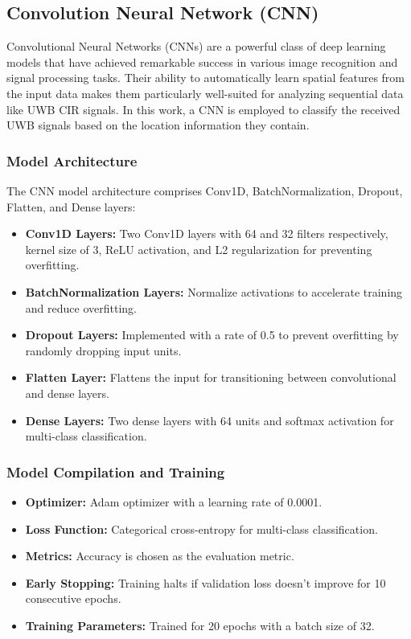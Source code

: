 \documentclass[
	article, %
	11pt, %
	draft, %
]{CSUniSchoolLabReport}
\begin{document}
\subsection{Convolution Neural Network (CNN)}\label{cnn}

Convolutional Neural Networks (CNNs) are a powerful class of deep learning models that have achieved remarkable success in various image recognition and signal processing tasks. Their ability to automatically learn spatial features from the input data makes them particularly well-suited for analyzing sequential data like UWB CIR signals. In this work, a CNN is employed to classify the received UWB signals based on the location information they contain.

\subsubsection{Model Architecture}

The CNN model architecture comprises Conv1D, BatchNormalization, Dropout, Flatten, and Dense layers:

\begin{itemize}
    \item \textbf{Conv1D Layers:} Two Conv1D layers with 64 and 32 filters respectively, kernel size of 3, ReLU activation, and L2 regularization for preventing overfitting.
    \item \textbf{BatchNormalization Layers:} Normalize activations to accelerate training and reduce overfitting.
    \item \textbf{Dropout Layers:} Implemented with a rate of 0.5 to prevent overfitting by randomly dropping input units.
    \item \textbf{Flatten Layer:} Flattens the input for transitioning between convolutional and dense layers.
    \item \textbf{Dense Layers:} Two dense layers with 64 units and softmax activation for multi-class classification.
\end{itemize}

\subsubsection{Model Compilation and Training}

\begin{itemize}
    \item \textbf{Optimizer:} Adam optimizer with a learning rate of 0.0001.
    \item \textbf{Loss Function:} Categorical cross-entropy for multi-class classification.
    \item \textbf{Metrics:} Accuracy is chosen as the evaluation metric.
    \item \textbf{Early Stopping:} Training halts if validation loss doesn't improve for 10 consecutive epochs.
    \item \textbf{Training Parameters:} Trained for 20 epochs with a batch size of 32.
\end{itemize}
\end{document}
